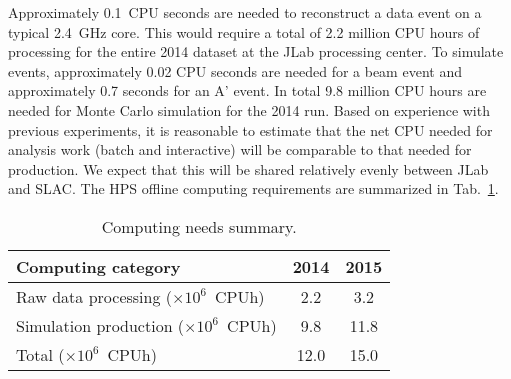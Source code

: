 Approximately 0.1~CPU seconds are needed to reconstruct a data event on 
a typical 2.4~GHz core. This would require a total of 2.2 million CPU hours of processing for the 
entire 2014 dataset at the JLab processing center.  To simulate events, approximately 0.02 CPU seconds 
are needed for a beam event and approximately 0.7 seconds for an A' event. In total 9.8 million CPU hours are needed for Monte Carlo 
simulation for the 2014 run. 
Based on experience with previous experiments, it is reasonable to estimate that the net CPU needed for 
analysis work (batch and interactive) will be comparable to that needed for production. {\color{red} We expect 
that this will be shared relatively evenly between JLab and SLAC.} The HPS offline computing requirements 
are summarized in Tab.~\ref{tab:computing}.
\begin{table}[tbp]
\centering
\begin{tabular}{|l|c|c|}
\hline
Computing category & 2014& 2015 \\
\hline
Raw data processing ($\times 10^{6}$~CPUh)  & 2.2 & 3.2 \\
Simulation production ($\times 10^{6}$~CPUh) & 9.8 & 11.8 \\
\hline
Total ($\times 10^{6}$~CPUh) & 12.0 & 15.0 \\
\hline
\end{tabular}
\caption{{\small Computing needs summary.}}
\label{tab:computing}
\end{table}
